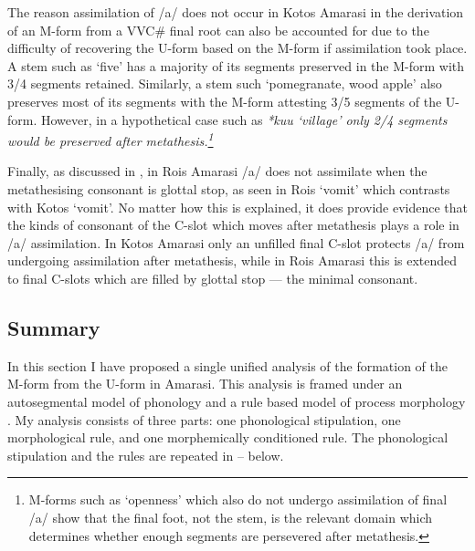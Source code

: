 The reason assimilation of /a/ does not
occur in Kotos Amarasi in the derivation of
an M-form from a VVC{\#} final root can also be accounted
for due to the difficulty of recovering
the U-form based on the M-form if assimilation took place.
A stem such as  {\ra}  `five'
has a majority of its segments preserved in the M-form with 3/4 segments retained.
Similarly, a stem such  {\ra}  `pomegranate, wood apple'
also preserves most of its segments with the M-form attesting 3/5 segments of the U-form.
However, in a hypothetical case such as  {\ra} \it{*kuu} `village'
only 2/4 segments would be preserved after metathesis.\footnote{
		M-forms such as  {\ra}  `openness' which
		also do not undergo assimilation of final /a/
		show that the final foot, not the stem, is the relevant domain
		which determines whether enough segments are persevered after metathesis.}

Finally, as discussed in , in Ro{\Q}is Amarasi
/a/ does not assimilate when the metathesising consonant is glottal stop,
as seen in Ro{\Q}is  {\ra}  `vomit'
which contrasts with Kotos  {\ra}  `vomit'.
No matter how this is explained, it does provide evidence that
the kinds of consonant of the C-slot which moves after
metathesis plays a role in /a/ assimilation.
In Kotos Amarasi only an unfilled final C-slot protects
/a/ from undergoing assimilation after metathesis,
while in Ro{\Q}is Amarasi this is extended to final
C-slots which are filled by glottal stop --- the minimal consonant.

\subsection{Summary}
In this section I have proposed a single unified
analysis of the formation of the M-form
from the U-form in Amarasi.
This analysis is framed under an autosegmental model of phonology \citep{go76}
and a rule based model of process morphology \citep{ma74,an92}.
My analysis consists of three parts:
one phonological stipulation, one morphological rule,
and one morphemically conditioned rule.
The phonological stipulation and the rules
are repeated in -- below.

\begin{exe}
	\label{ex3:Ft.->CVCVC}
	\label{ex2:CV->VC/'V-}
	\label{ex2:'VaC->VC}
\end{exe}

